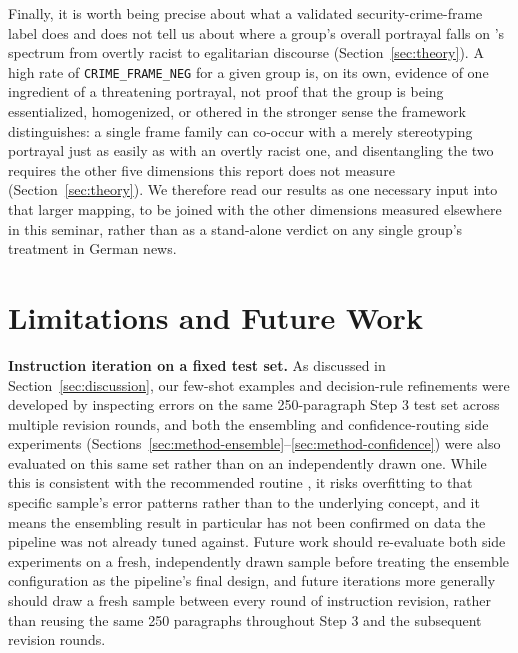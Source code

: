 \documentclass[a4paper,oneside,bibliography=totoc]{scrartcl}
\begin{document}
Finally, it is worth being precise about what a validated security-crime-frame label does and does not tell us about where a group's overall portrayal falls on \citeauthor{freudenthaler2025}'s spectrum from overtly racist to egalitarian discourse (Section~\ref{sec:theory}). A high rate of \texttt{CRIME\_FRAME\_NEG} for a given group is, on its own, evidence of one ingredient of a threatening portrayal, not proof that the group is being essentialized, homogenized, or othered in the stronger sense the framework distinguishes: a single frame family can co-occur with a merely stereotyping portrayal just as easily as with an overtly racist one, and disentangling the two requires the other five dimensions this report does not measure (Section~\ref{sec:theory}). We therefore read our results as one necessary input into that larger mapping, to be joined with the other dimensions measured elsewhere in this seminar, rather than as a stand-alone verdict on any single group's treatment in German news. %

\section{Limitations and Future Work}
\label{sec:limitations}

\textbf{Instruction iteration on a fixed test set.} As discussed in Section~\ref{sec:discussion}, our few-shot examples and decision-rule refinements were developed by inspecting errors on the same 250-paragraph Step 3 test set across multiple revision rounds, and both the ensembling and confidence-routing side experiments (Sections~\ref{sec:method-ensemble}--\ref{sec:method-confidence}) were also evaluated on this same set rather than on an independently drawn one. While this is consistent with the recommended routine \citep{freudenthalerbacchuss}, it risks overfitting to that specific sample's error patterns rather than to the underlying concept, and it means the ensembling result in particular has not been confirmed on data the pipeline was not already tuned against. Future work should re-evaluate both side experiments on a fresh, independently drawn sample before treating the ensemble configuration as the pipeline's final design, and future iterations more generally should draw a fresh sample between every round of instruction revision, rather than reusing the same 250 paragraphs throughout Step 3 and the subsequent revision rounds.
\end{document}
